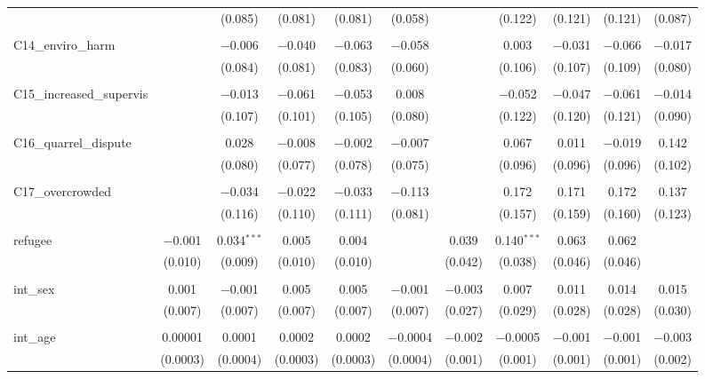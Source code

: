 \begin{table}[H]
\begin{tabular}{@{\extracolsep{4pt}}lcccccccccc}
  &  & (0.085) & (0.081) & (0.081) & (0.058) &  & (0.122) & (0.121) & (0.121) & (0.087) \\ 
  & & & & & & & & & & \\ 
 C14\_enviro\_harm &  & $-$0.006 & $-$0.040 & $-$0.063 & $-$0.058 &  & 0.003 & $-$0.031 & $-$0.066 & $-$0.017 \\ 
  &  & (0.084) & (0.081) & (0.083) & (0.060) &  & (0.106) & (0.107) & (0.109) & (0.080) \\ 
  & & & & & & & & & & \\ 
 C15\_increased\_supervis &  & $-$0.013 & $-$0.061 & $-$0.053 & 0.008 &  & $-$0.052 & $-$0.047 & $-$0.061 & $-$0.014 \\ 
  &  & (0.107) & (0.101) & (0.105) & (0.080) &  & (0.122) & (0.120) & (0.121) & (0.090) \\ 
  & & & & & & & & & & \\ 
 C16\_quarrel\_dispute &  & 0.028 & $-$0.008 & $-$0.002 & $-$0.007 &  & 0.067 & 0.011 & $-$0.019 & 0.142 \\ 
  &  & (0.080) & (0.077) & (0.078) & (0.075) &  & (0.096) & (0.096) & (0.096) & (0.102) \\ 
  & & & & & & & & & & \\ 
 C17\_overcrowded &  & $-$0.034 & $-$0.022 & $-$0.033 & $-$0.113 &  & 0.172 & 0.171 & 0.172 & 0.137 \\ 
  &  & (0.116) & (0.110) & (0.111) & (0.081) &  & (0.157) & (0.159) & (0.160) & (0.123) \\ 
  & & & & & & & & & & \\ 
 refugee & $-$0.001 & 0.034$^{***}$ & 0.005 & 0.004 &  & 0.039 & 0.140$^{***}$ & 0.063 & 0.062 &  \\ 
  & (0.010) & (0.009) & (0.010) & (0.010) &  & (0.042) & (0.038) & (0.046) & (0.046) &  \\ 
  & & & & & & & & & & \\ 
 int\_sex & 0.001 & $-$0.001 & 0.005 & 0.005 & $-$0.001 & $-$0.003 & 0.007 & 0.011 & 0.014 & 0.015 \\ 
  & (0.007) & (0.007) & (0.007) & (0.007) & (0.007) & (0.027) & (0.029) & (0.028) & (0.028) & (0.030) \\ 
  & & & & & & & & & & \\ 
 int\_age & 0.00001 & 0.0001 & 0.0002 & 0.0002 & $-$0.0004 & $-$0.002 & $-$0.0005 & $-$0.001 & $-$0.001 & $-$0.003 \\ 
  & (0.0003) & (0.0004) & (0.0003) & (0.0003) & (0.0004) & (0.001) & (0.001) & (0.001) & (0.001) & (0.002) \\ 

\end{tabular}
\end{table}

